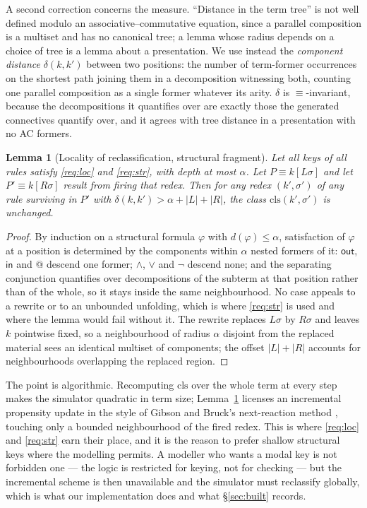 \documentclass[11pt,a4paper]{article}
\theoremstyle{plain}
\newtheorem{lemma}[theorem]{Lemma}
\theoremstyle{definition}
\theoremstyle{remark}
\newcommand{\out}{\mathsf{out}}
\newcommand{\inn}{\mathsf{in}}
\newcommand{\dpt}{d}
\newcommand{\class}{\mathrm{cls}}
\begin{document}
A second correction concerns the measure. ``Distance in the term tree'' is not well defined modulo an
associative--commutative equation, since a parallel composition is a multiset and has no canonical
tree; a lemma whose radius depends on a choice of tree is a lemma about a presentation. We use
instead the \emph{component distance} $\delta(k,k')$ between two positions: the number of term-former
occurrences on the shortest path joining them in a decomposition witnessing both, counting one
parallel composition as a single former whatever its arity. $\delta$ is $\equiv$-invariant, because
the decompositions it quantifies over are exactly those the generated connectives quantify over, and
it agrees with tree distance in a presentation with no AC formers.

\begin{lemma}[Locality of reclassification, structural fragment]
\label{lem:locality}
Let all keys of all rules satisfy \ref{req:loc} and \ref{req:str}, with depth at most $\alpha$. Let
$P \equiv k[L\sigma]$ and let $P' \equiv k[R\sigma]$ result from firing that redex. Then for any
redex $(k', \sigma')$ of any rule surviving in $P'$ with
$\delta(k,k') > \alpha + |L| + |R|$, the class $\class(k',\sigma')$ is unchanged.
\end{lemma}

\begin{proof}
By induction on a structural formula $\varphi$ with $\dpt(\varphi) \le \alpha$, satisfaction of
$\varphi$ at a position is determined by the components within $\alpha$ nested formers of it:
$\out$, $\inn$ and $@$ descend one former; $\wedge$, $\vee$ and $\neg$ descend none; and the
separating conjunction quantifies over decompositions of the subterm at that position rather than of
the whole, so it stays inside the same neighbourhood. No case appeals to a rewrite or to an unbounded
unfolding, which is where \ref{req:str} is used and where the lemma would fail without it. The
rewrite replaces $L\sigma$ by $R\sigma$ and leaves $k$ pointwise fixed, so a neighbourhood of radius
$\alpha$ disjoint from the replaced material sees an identical multiset of components; the offset
$|L| + |R|$ accounts for neighbourhoods overlapping the replaced region.
\end{proof}

The point is algorithmic. Recomputing $\class$ over the whole term at every step makes the simulator
quadratic in term size; Lemma~\ref{lem:locality} licenses an incremental propensity update in the
style of Gibson and Bruck's next-reaction method \cite{gibson-bruck}, touching only a bounded
neighbourhood of the fired redex. This is where \ref{req:loc} and \ref{req:str} earn their place, and
it is the reason to prefer shallow structural keys where the modelling permits. A modeller who wants
a modal key is not forbidden one --- the logic is restricted for keying, not for checking --- but the
incremental scheme is then unavailable and the simulator must reclassify globally, which is what our
implementation does and what \S\ref{sec:built} records.
\end{document}

